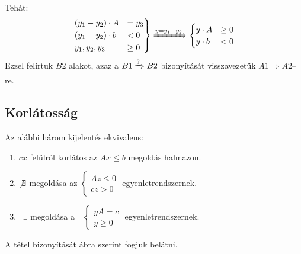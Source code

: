 Tehát:
\[
	\begin{rcases}
		(y_1 - y_2) \cdot A & = y_3  \\
		(y_1 - y_2) \cdot b & < 0    \\
		y_1, y_2, y_3       & \geq 0
	\end{rcases} \xRightarrow{y=y_1-y_2}
	\begin{cases}
		y \cdot A & \geq 0 \\
		y \cdot b & < 0
	\end{cases}
\]
Ezzel felírtuk $B2$ alakot, azaz a $B1\xRightarrow{?}B2$ bizonyítását
visszavezetük $A1 \Rightarrow A2$--re.

\subsection{Korlátosság}

Az alábbi három kijelentés ekvivalens:

\begin{enumerate}
	\item $cx$ felülről korlátos az $Ax \leq b$ megoldás halmazon.
	\item $\not \exists$ megoldása az $ \begin{cases}
			      Az \leq 0 \\
			      cz > 0
		      \end{cases} $ egyenletrendszernek.
	\item ~$\exists$ megoldása a~~$\begin{cases}
			      yA=c \\
			      y \geq 0
		      \end{cases}$ egyenletrendszernek.
\end{enumerate}

A tétel bizonyítását  ábra szerint fogjuk belátni.

